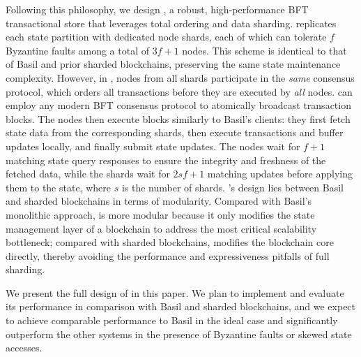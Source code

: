 Following this philosophy, we design \sys, a robust, high-performance BFT transactional store that leverages total ordering and data sharding.
\sys replicates each state partition with dedicated node shards, each of which can tolerate $f$ Byzantine faults among a total of $3f+1$ nodes.
This scheme is identical to that of Basil and prior sharded blockchains, preserving the same state maintenance complexity.
However, in \sys, nodes from all shards participate in the \emph{same} consensus protocol, which orders all transactions before they are executed by \emph{all} nodes.
\sys can employ any modern BFT consensus protocol to atomically broadcast transaction blocks.
The \sys nodes then execute blocks similarly to Basil's clients: they first fetch state data from the corresponding shards, then execute transactions and buffer updates locally, and finally submit state updates.
The nodes wait for $f+1$ matching state query responses to ensure the integrity and freshness of the fetched data, while the shards wait for $2sf+1$ matching updates before applying them to the state, where $s$ is the number of shards.
\sys's design lies between Basil and sharded blockchains in terms of modularity.
Compared with Basil's monolithic approach, \sys is more modular because it only modifies the state management layer of a blockchain to address the most critical scalability bottleneck; compared with sharded blockchains, \sys modifies the blockchain core directly, thereby avoiding the performance and expressiveness pitfalls of full sharding.

We present the full design of \sys in this paper.
We plan to implement \sys and evaluate its performance in comparison with Basil and sharded blockchains, and we expect \sys to achieve comparable performance to Basil in the ideal case and significantly outperform the other systems in the presence of Byzantine faults or skewed state accesses.
